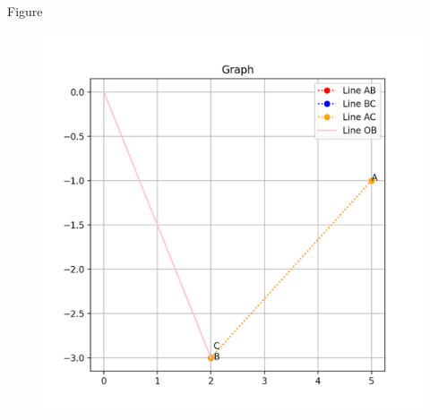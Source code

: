 \documentclass{beamer}
\begin{document}
\begin{frame}{Figure}
\begin{figure}[H]
    \centering
    \includegraphics[width=0.6\columnwidth]{figs/Figure.png}
    \caption{}
    \label{fig:placeholder}
\end{figure}
\end{frame}
\end{document}

